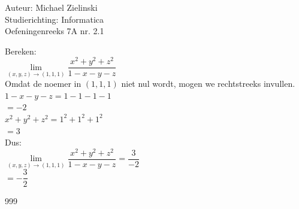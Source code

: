 \documentclass[a4paper]{article}
\begin{document}
  
\noindent \large Auteur: Michael Zielinski \\
\noindent \large Studierichting: Informatica\\
\noindent \large Oefeningenreeks 7A nr. 2.1\\

\medskip

\normalsize

Bereken: \\

$ \lim\limits_{(x,y,z)\rightarrow(1,1,1)}
\dfrac{x^2+y^2+z^2}{1-x-y-z} $ \\

Omdat de noemer in $(1,1,1)$ niet nul wordt, mogen we rechtstreeks invullen. \\

$ 1-x-y-z = 1-1-1-1 $ \\

$ = -2 $ \\

$ x^2+y^2+z^2 = 1^2+1^2+1^2 $ \\

$ = 3 $ \\

Dus: \\

$ \lim\limits_{(x,y,z)\rightarrow(1,1,1)}
\dfrac{x^2+y^2+z^2}{1-x-y-z}
= \dfrac{3}{-2} $ \\

$ = -\dfrac{3}{2} $ \\

\begin{thebibliography}{999}
\end{thebibliography}
\end{document}
